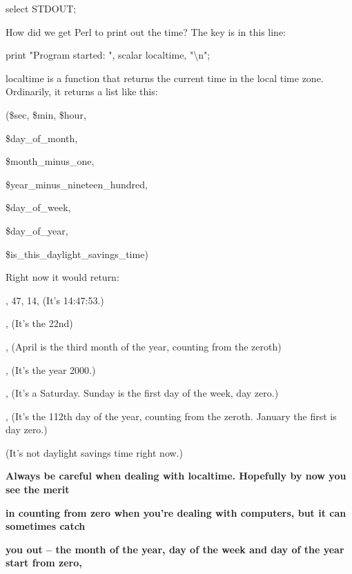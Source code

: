 \documentclass[a4paper,11pt]{book}
\begin{document}
\noindent select STDOUT;

\noindent 

\noindent How did we get Perl to print out the time? The key is in this line:

\noindent 

\noindent 

\noindent print "Program started: ", scalar localtime, "\textbackslash n";

\noindent 

\noindent localtime is a function that returns the current time in the local time zone. Ordinarily, it returns a list like this:

\noindent 

\noindent 

\noindent (\$sec, \$min, \$hour,

\noindent \$day\_of\_month,

\noindent \$month\_minus\_one,

\noindent \$year\_minus\_nineteen\_hundred,

\noindent \$day\_of\_week,

\noindent \$day\_of\_year,

\noindent \$is\_this\_daylight\_savings\_time)

\noindent 

\noindent Right now it would return:

\noindent 

, 47, 14, (It's 14:47:53.)

, (It's the 22nd)

, (April is the third month of the year, counting from the zeroth)

, (It's the year 2000.)

, (It's a Saturday. Sunday is the first day of the week, day zero.)

, (It's the 112th   day of the year, counting from the zeroth. January the first is day zero.)

 (It's not daylight savings time right now.)

\noindent 

\noindent 

\noindent \textbf{Always be careful when dealing with localtime. Hopefully by now you see the merit}

\noindent \textbf{in counting from zero when you're dealing with computers, but it can sometimes catch}

\noindent \textbf{you out -- the month of the year, day of the week and day of the year start from zero,}
\end{document}
